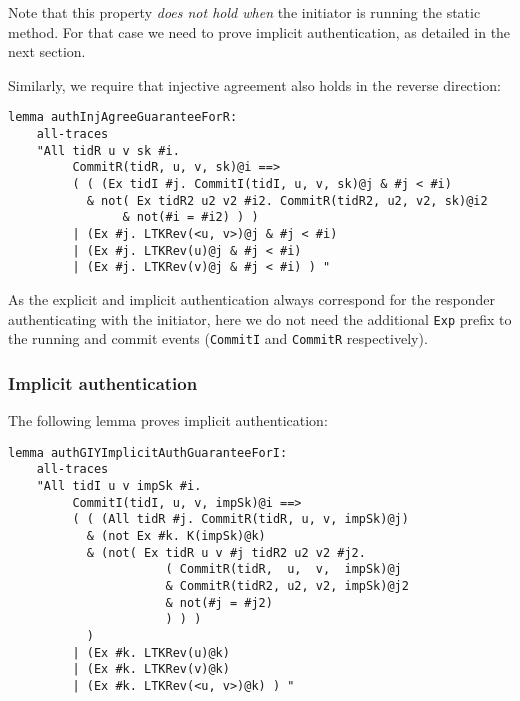 Note that this property \emph{does not hold when} the initiator is
running the static method.
%
For that case we need to prove implicit authentication, as detailed in
the next section.

Similarly, we require that injective agreement also holds in the
reverse direction:

\begin{lstlisting}
lemma authInjAgreeGuaranteeForR:
    all-traces
    "All tidR u v sk #i.
         CommitR(tidR, u, v, sk)@i ==>
         ( ( (Ex tidI #j. CommitI(tidI, u, v, sk)@j & #j < #i)
           & not( Ex tidR2 u2 v2 #i2. CommitR(tidR2, u2, v2, sk)@i2
                & not(#i = #i2) ) )
         | (Ex #j. LTKRev(<u, v>)@j & #j < #i)
         | (Ex #j. LTKRev(u)@j & #j < #i)
         | (Ex #j. LTKRev(v)@j & #j < #i) ) "
\end{lstlisting}

As the explicit and implicit authentication always correspond for the
responder authenticating with the initiator, here we do not need the
additional \lstinline{Exp} prefix to the running and commit events
(\lstinline{CommitI} and \lstinline{CommitR} respectively).

\subsubsection{Implicit authentication}

The following lemma proves implicit authentication:
\begin{lstlisting}
lemma authGIYImplicitAuthGuaranteeForI:
    all-traces
    "All tidI u v impSk #i.
         CommitI(tidI, u, v, impSk)@i ==>
         ( ( (All tidR #j. CommitR(tidR, u, v, impSk)@j)
           & (not Ex #k. K(impSk)@k)
           & (not( Ex tidR u v #j tidR2 u2 v2 #j2.
                      ( CommitR(tidR,  u,  v,  impSk)@j
                      & CommitR(tidR2, u2, v2, impSk)@j2
                      & not(#j = #j2)
                      ) ) )
           )
         | (Ex #k. LTKRev(u)@k)
         | (Ex #k. LTKRev(v)@k)
         | (Ex #k. LTKRev(<u, v>)@k) ) "
\end{lstlisting}

